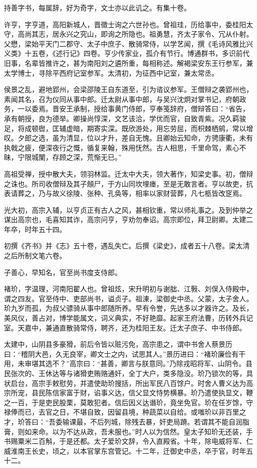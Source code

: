 \documentclass[]{article}
\begin{document}
持善字书，每属辞，好为奇字，文士亦以此讥之。有集十卷。

许亨，字亨道，高阳新城人，晋徵士询之六世孙也。曾祖珪，历给事中，委桂阳太守，高尚其志，居永兴之究山，即询之所隐也。祖勇慧，齐太子家令、冗从仆射。父懋，梁始平天门二郡守、太子中庶子、散骑常侍，以学艺闻，撰《毛诗风雅比兴义类》十五卷，《述行记》四卷。亨少传家业，孤介有节行。博通群书，多识前代旧事，名辈皆推许之，甚为南阳刘之遴所重，每相称述。解褐梁安东王行参军，兼太学博士，寻除平西府记室参军。太清初，为征西中记室，兼太常丞。

侯景之乱，避地郢州，会梁邵陵王自东道至，引为谘议参军。王僧辩之袭郢州也，素闻其名，召为仪同从事中郎。迁太尉从事中郎，与吴兴沈炯对掌书记，府朝政务，一以委焉。晋安王承制，授给事黄门侍郎，亨奉笺辞府，僧辩答曰：``省告，承有朝授，良为德举。卿操尚惇深，文艺该洽，学优而官，自致青紫。况久羁骏足，将成顿辔，匡辅虚暗，期寄实深。既欣游处，用忘劳屈，而枳棘栖鹓，常以增叹。夕郎之选，虽为清显，位以才升，差自无愧。且卿始云知命，方骋康衢，未有执戟之疲，便深夜行之慨，循复来翰，殊用怃然。古人相思，千里命驾，素心不昧，宁限城闉，存顾之深，荒惭无已。''

高祖受禅，授中散大夫，领羽林监。迁太中大夫，领大著作，知梁史事。初，僧辩之诛也。所司收僧辩及其子頠尸，于方山同坎埋瘗，至是无敢言者。亨以故吏，抗表请葬之，乃与故义徐陵、张种、孔奂等，相率以家财营葬，凡七柩皆改窆焉。

光大初，高宗入辅，以亨贞正有古人之风，甚相钦重，常以师礼事之。及到仲举之谋出高宗也，毛喜知其诈，高宗问亨，亨劝勿奉诏。高宗即位，拜卫尉卿。太建二年卒，时年五十四。

初撰《齐书》并《志》五十卷，遇乱失亡。后撰《梁史》，成者五十八卷。梁太清之后所制文笔六卷。

子善心，早知名，官至尚书度支侍郎。

褚玠，字温理，河南阳翟人也。曾祖炫，宋升明初与谢朏、江斅、刘俣入侍殿中，谓之四友。官至侍中、吏部尚书，谥贞子。祖涷，梁御史中丞。父蒙，太子舍人。玠九岁而孤，为叔父骠骑从事中郎随所养。早有令誉，先达多以才器许之。及长，美风仪，善占对，博学能属文，词义典实，不好艳靡。起家王府法曹，历转外兵记室。天嘉中，兼通直散骑常侍，聘齐，还为桂阳王友。迁太子庶子、中书侍郎。

太建中，山阴县多豪猾，前后令皆以赃污免，高宗患之，谓中书舍人蔡景历曰：``稽阴大邑，久无良宰，卿文士之内，试思其人。''景历进曰：``褚玠廉俭有干用，未审堪其选不？''高宗曰：``甚善，卿言与朕意同。''乃除戎昭将军、山阴令。县民张次的、王休达等与诸猾吏贿赂通奸，全丁大户，类多隐没。玠乃锁次的等，具状启台，高宗手敕慰劳，并遣使助玠搜括，所出军民八百馀户。时舍人曹义达为高宗所宠，县民陈信家富于财，谄事义达，信父显文恃势横暴。玠乃遣使执显文，鞭之一百，于是吏民股栗，莫敢犯者。信后因义达谮玠，竟坐免官。玠在任岁馀，守禄俸而已，去官之日，不堪自致，因留县境，种蔬菜以自给。或嗤玠以非百里之才，玠答曰：``吾委输课最，不后列城，除残去暴，奸吏局蹐。若谓其不能自润脂膏，则如来命。以为不达从政，吾未服也。''时人以为信然。皇太子知玠无还装，手书赐粟米二百斛，于是还都。太子爱玠文辞，令入直殿省。十年，除电威将军、仁威淮南王长史，顷之，以本官掌东宫管记。十二年，迁御史中丞，卒于官，时年五十二。
\end{document}
